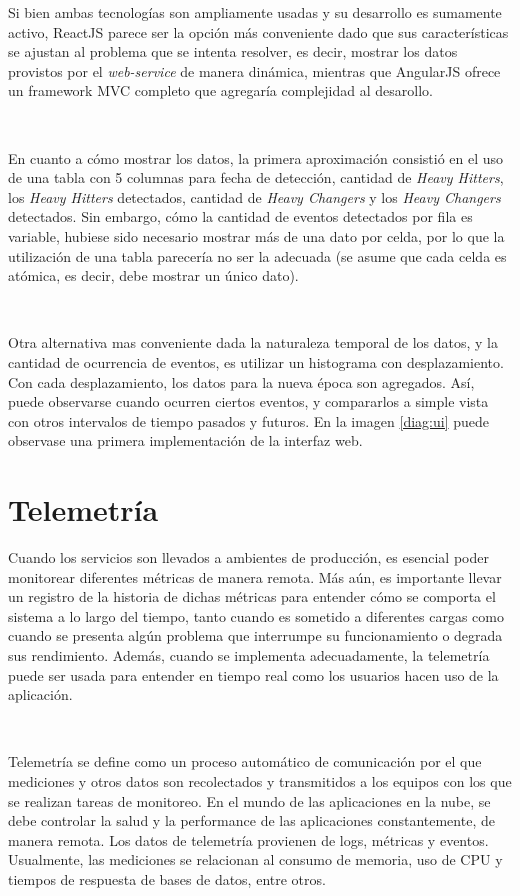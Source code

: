\documentclass[a4paper,12pt, oneside]{article}
\begin{document}
Si bien ambas tecnologías son ampliamente usadas y su desarrollo es sumamente activo, ReactJS parece ser la opción más conveniente dado que sus características se ajustan al problema que se intenta resolver, es decir, mostrar los datos provistos por el \textit{web-service} de manera dinámica, mientras que AngularJS ofrece un framework MVC completo que agregaría complejidad al desarollo.

\

En cuanto a cómo mostrar los datos, la primera aproximación consistió en el uso de una tabla con 5 columnas para fecha de detección, cantidad de \textit{Heavy Hitters}, los \textit{Heavy Hitters} detectados, cantidad de \textit{Heavy Changers} y los \textit{Heavy Changers} detectados. Sin embargo, cómo la cantidad de eventos detectados por fila es variable, hubiese sido necesario mostrar más de una dato por celda, por lo que la utilización de una tabla parecería no ser la adecuada (se asume que cada celda es atómica, es decir, debe mostrar un único dato).

\

Otra alternativa mas conveniente dada la naturaleza temporal de los datos, y la cantidad de ocurrencia de eventos, es utilizar un histograma con desplazamiento. Con cada desplazamiento, los datos para la nueva época son agregados. Así, puede observarse cuando ocurren ciertos eventos, y compararlos a simple vista con otros intervalos de tiempo pasados y futuros. En la imagen \ref{diag:ui} puede observase una primera implementación de la interfaz web.


\newpage

\section{Telemetría}
Cuando los servicios son llevados a ambientes de producción, es esencial poder monitorear diferentes métricas de manera remota. Más aún, es importante llevar un registro de la historia de dichas métricas para entender cómo se comporta el sistema a lo largo del tiempo, tanto cuando es sometido a diferentes cargas como cuando se presenta algún problema que interrumpe su funcionamiento o degrada sus rendimiento. Además, cuando se implementa adecuadamente, la telemetría puede ser usada para entender en tiempo real como los usuarios hacen uso de la aplicación.

\

Telemetría se define como un proceso automático de comunicación por el que mediciones y otros datos son recolectados y transmitidos a los equipos con los que se realizan tareas de monitoreo. En el mundo de las aplicaciones en la nube, se debe controlar la salud y la performance de las aplicaciones constantemente, de manera remota. Los datos de telemetría provienen de logs, métricas y eventos. Usualmente, las mediciones se relacionan al consumo de memoria, uso de CPU y tiempos de respuesta de bases de datos, entre otros.
\end{document}
